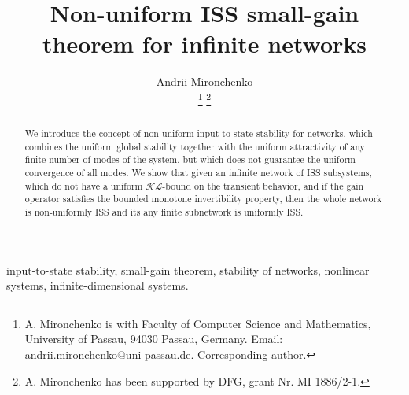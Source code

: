 \documentclass[twocolumn]{IEEEtran} %
\theoremstyle{definition}
\newcommand{\KL}{\mathcal{KL}}%
\begin{document}
\title{Non-uniform ISS small-gain theorem for infinite networks}

\author{Andrii Mironchenko

\thanks{A. Mironchenko is with 
Faculty of Computer Science and Mathematics, University of Passau,
94030 Passau, Germany.
Email: andrii.mironchenko@uni-passau.de. Corresponding author.
}
\thanks{
A. Mironchenko has been supported by DFG, grant Nr. MI 1886/2-1.
}
}


\maketitle





\begin{abstract}
We introduce the concept of non-uniform input-to-state stability for networks,
which combines the uniform global stability together with the uniform attractivity of any finite number of modes of the system, but which does not guarantee the uniform convergence of all modes.
We show that given an infinite network of ISS subsystems, which do not have a uniform $\KL$-bound on the transient behavior, and if the gain operator satisfies the  bounded monotone invertibility property, then the whole network is non-uniformly ISS and its any finite subnetwork is uniformly ISS. 
\end{abstract}


\begin{IEEEkeywords}
input-to-state stability, small-gain theorem, stability of networks, nonlinear systems, infinite-dimensional systems.
\end{IEEEkeywords}
\end{document}
